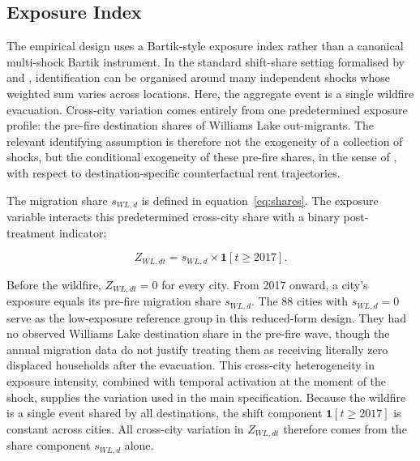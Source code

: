 \documentclass[12pt]{article}
\begin{document}
\subsection{Exposure Index}

The empirical design uses a Bartik-style exposure index rather than a canonical
multi-shock Bartik instrument. In the standard shift-share setting formalised
by \citet{goldsmith2020} and \citet{borusyak2022}, identification can be
organised around many independent shocks whose weighted sum varies across
locations. Here, the aggregate event is a single wildfire evacuation. Cross-city
variation comes entirely from one predetermined exposure profile: the pre-fire
destination shares of Williams Lake out-migrants. The relevant identifying
assumption is therefore not the exogeneity of a collection of shocks, but the
conditional exogeneity of these pre-fire shares, in the sense of
\citet{goldsmith2020}, with respect to destination-specific counterfactual
rent trajectories.

The migration share $s_{WL,d}$ is defined in equation~\eqref{eq:shares}. The
exposure variable interacts this predetermined cross-city share with a binary
post-treatment indicator:

\begin{equation}
Z_{WL,dt} = s_{WL,d} \times \mathbf{1}[t \geq 2017].
\label{eq:instrument}
\end{equation}

Before the wildfire, $Z_{WL,dt}=0$ for every city. From 2017 onward, a city's
exposure equals its pre-fire migration share $s_{WL,d}$. The 88 cities with
$s_{WL,d}=0$ serve as the low-exposure reference group in this reduced-form
design. They had no observed Williams Lake destination share in the pre-fire
wave, though the annual migration data do not justify treating them as receiving
literally zero displaced households after the evacuation. This cross-city
heterogeneity in exposure intensity, combined with temporal activation at the
moment of the shock, supplies the variation used in the main specification.
Because the wildfire is a single event shared by all destinations, the shift
component $\mathbf{1}[t \geq 2017]$ is constant across cities. All cross-city
variation in $Z_{WL,dt}$ therefore comes from the share component $s_{WL,d}$
alone.
\end{document}
